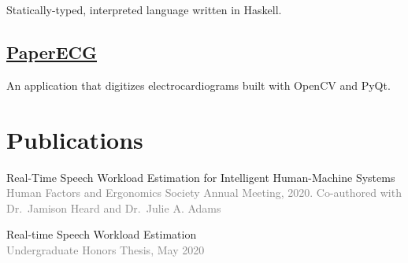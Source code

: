 \documentclass[12pt]{article} %
\let\defaultref\href
\renewcommand{\href}[2]{%
  \defaultref{#1}{\ul{#2}}%
}
\renewcommand{\emph}[1]{%
  \textcolor{gray}{#1}%
}
\begin{document}
\begin{paracol}{2}
\begin{raggedright}
Statically-typed, interpreted language written in Haskell.

\hypertarget{paperecg}{%
\subsection{\texorpdfstring{\href{https://github.com/Tereshchenkolab/paper-ecg}{PaperECG}}{PaperECG}}\label{paperecg}}

An application that digitizes electrocardiograms built with OpenCV and
PyQt.

\hypertarget{publications}{%
\section{Publications}\label{publications}}

\vspace{1pt}

Real-Time Speech Workload Estimation for Intelligent Human-Machine
Systems\\
\emph{Human Factors and Ergonomics Society Annual Meeting, 2020.
Co-authored with Dr.~Jamison Heard and Dr.~Julie A. Adams}

Real-time Speech Workload Estimation\\
\emph{Undergraduate Honors Thesis, May 2020}

\end{raggedright}
\end{paracol}
\end{document}
